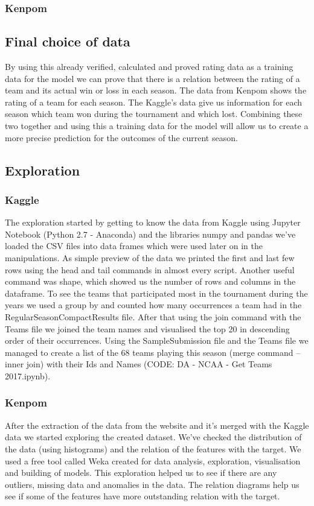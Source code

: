 \documentclass[
10pt, %
a4paper, %
oneside, %
headinclude,footinclude, %
BCOR5mm, %
]{scrartcl}
\begin{document}
\subsubsection{Kenpom}

\subsection{Final choice of data}
By using this already verified, calculated and proved rating data as a training data for the model we can prove that there is a relation between the rating of a team and its actual win or loss in each season.
The data from Kenpom shows the rating of a team for each season. The Kaggle’s data give us information for each season which team won during the tournament and which lost. Combining these two together and using this a training data for the model will allow us to create a more precise prediction for the outcomes of the current season.

\subsection{Exploration}
\subsubsection{Kaggle}
The exploration started by getting to know the data from Kaggle using Jupyter Notebook (Python 2.7 - Anaconda) and the libraries numpy and pandas we’ve loaded the CSV files into data frames which were used later on in the manipulations.
As simple preview of the data we printed the first and last few rows using the head and tail commands in almost every script. Another useful command was shape, which showed us the number of rows and columns in the dataframe.
To see the teams that participated most in the tournament during the years we used a group by and counted how many occurrences a team had in the RegularSeasonCompactResults file. After that using the join command with the Teams file we joined the team names and visualised the top 20 in descending order of their occurrences.
Using the SampleSubmission file and the Teams file we managed to create a list of the 68 teams playing this season (merge command – inner join) with their Ids and Names (CODE: DA - NCAA - Get Teams 2017.ipynb).
\subsubsection{Kenpom}
After the extraction of the data from the website and it’s merged with the Kaggle data we started exploring the created dataset.
We’ve checked the distribution of the data (using histograms) and the relation of the features with the target. We used a free tool called Weka created for data analysis, exploration, visualisation and building of models. This exploration helped us to see if there are any outliers, missing data and anomalies in the data. The relation diagrams help us see if some of the features have more outstanding relation with the target.
\end{document}
